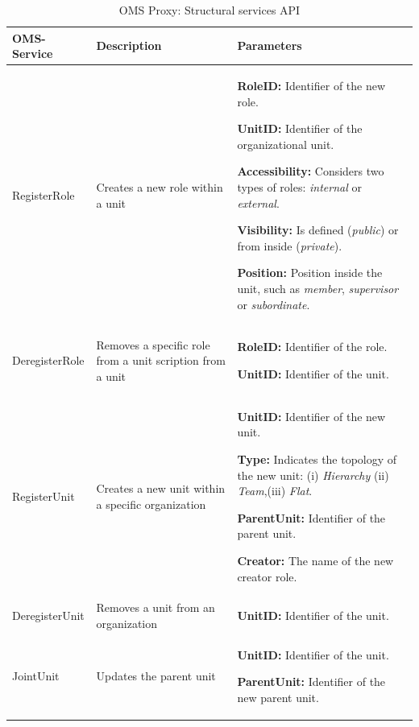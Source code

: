 \begin{table}[h!t]
\begin{tabular}{|l|p{5cm}|p{5cm}|}
\hline
OMS-Service & Description & Parameters \\ \hline
RegisterRole & Creates a new role within a unit &


\textbf{RoleID: } Identifier of the new role. 

\textbf{UnitID:} Identifier of the organizational unit.

\textbf{Accessibility:} Considers two types of roles: \textit{internal} or \textit{external}.

\textbf{Visibility:} Is defined (\textit{public}) or from inside (\textit{private}).

\textbf{Position:} Position inside the unit, such as \textit{member}, \textit{supervisor} or \textit{subordinate}.

\\  \hline

DeregisterRole & Removes a specific role from a unit
scription from a unit 
& 
\textbf{RoleID:} Identifier of the role. 

\textbf{UnitID:} Identifier of the unit.

\\  \hline

RegisterUnit & Creates a new unit within a specific organization
 &

\textbf{UnitID:} Identifier of the new unit.

\textbf{Type:} Indicates the topology of the new unit: (i) \textit{Hierarchy} (ii) \textit{Team},(iii)\textit{ Flat}.

\textbf{ParentUnit:} Identifier of the parent unit.

\textbf{Creator:} The name of the new creator role.

\\  \hline

DeregisterUnit & Removes a unit from an organization
 &
\textbf{UnitID:} Identifier of the unit.

\\  \hline

JointUnit & Updates the parent unit
 &
\textbf{UnitID:} Identifier of the unit.

\textbf{ParentUnit:} Identifier of the new parent unit.

\\  \hline
\end{tabular}
\caption{OMS Proxy: Structural services API}
\label{tab:thomas_OMSProxy_registration}
\end{table}



